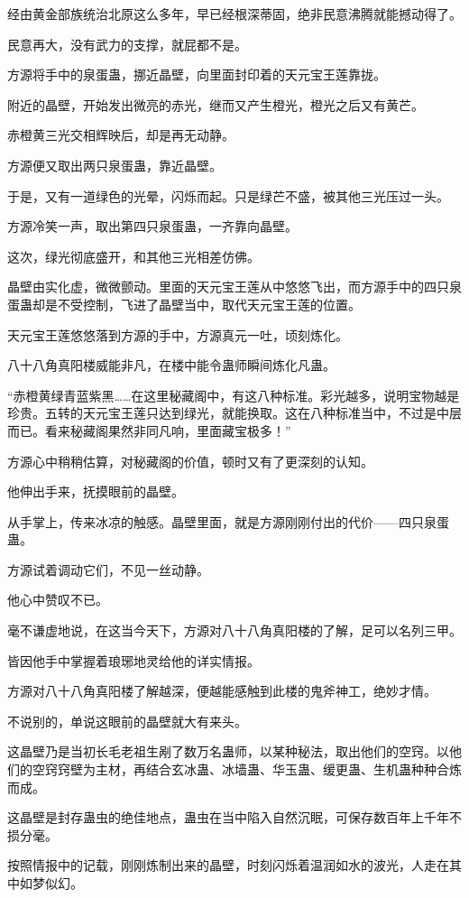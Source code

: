 \begin{this_body}
经由黄金部族统治北原这么多年，早已经根深蒂固，绝非民意沸腾就能撼动得了。

民意再大，没有武力的支撑，就屁都不是。

方源将手中的泉蛋蛊，挪近晶壁，向里面封印着的天元宝王莲靠拢。

附近的晶壁，开始发出微亮的赤光，继而又产生橙光，橙光之后又有黄芒。

赤橙黄三光交相辉映后，却是再无动静。

方源便又取出两只泉蛋蛊，靠近晶壁。

于是，又有一道绿色的光晕，闪烁而起。只是绿芒不盛，被其他三光压过一头。

方源冷笑一声，取出第四只泉蛋蛊，一齐靠向晶壁。

这次，绿光彻底盛开，和其他三光相差仿佛。

晶壁由实化虚，微微颤动。里面的天元宝王莲从中悠悠飞出，而方源手中的四只泉蛋蛊却是不受控制，飞进了晶壁当中，取代天元宝王莲的位置。

天元宝王莲悠悠落到方源的手中，方源真元一吐，顷刻炼化。

八十八角真阳楼威能非凡，在楼中能令蛊师瞬间炼化凡蛊。

“赤橙黄绿青蓝紫黑……在这里秘藏阁中，有这八种标准。彩光越多，说明宝物越是珍贵。五转的天元宝王莲只达到绿光，就能换取。这在八种标准当中，不过是中层而已。看来秘藏阁果然非同凡响，里面藏宝极多！”

方源心中稍稍估算，对秘藏阁的价值，顿时又有了更深刻的认知。

他伸出手来，抚摸眼前的晶壁。

从手掌上，传来冰凉的触感。晶壁里面，就是方源刚刚付出的代价——四只泉蛋蛊。

方源试着调动它们，不见一丝动静。

他心中赞叹不已。

毫不谦虚地说，在这当今天下，方源对八十八角真阳楼的了解，足可以名列三甲。

皆因他手中掌握着琅琊地灵给他的详实情报。

方源对八十八角真阳楼了解越深，便越能感触到此楼的鬼斧神工，绝妙才情。

不说别的，单说这眼前的晶壁就大有来头。

这晶壁乃是当初长毛老祖生剐了数万名蛊师，以某种秘法，取出他们的空窍。以他们的空窍窍壁为主材，再结合玄冰蛊、冰墙蛊、华玉蛊、缓更蛊、生机蛊种种合炼而成。

这晶壁是封存蛊虫的绝佳地点，蛊虫在当中陷入自然沉眠，可保存数百年上千年不损分毫。

按照情报中的记载，刚刚炼制出来的晶壁，时刻闪烁着温润如水的波光，人走在其中如梦似幻。


\end{this_body}
